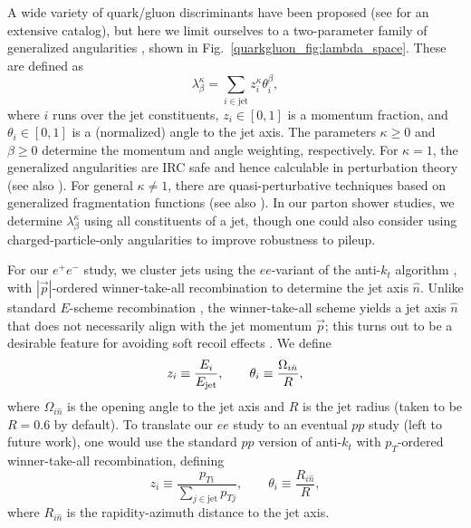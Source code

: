 \documentclass[11pt]{cernrep}
\begin{document}
A wide variety of quark/gluon discriminants have been proposed (see \cite{Gallicchio:2012ez} for an extensive catalog), but here we limit ourselves to a two-parameter family of generalized angularities \cite{Larkoski:2014pca}, shown in Fig.~\ref{quarkgluon_fig:lambda_space}.  These are defined as
\begin{equation}
\label{quarkgluon_eq:genang}
\lambda^{\kappa}_{\beta} = \sum_{i \in \text{jet}} z_i^\kappa \theta_i^\beta,
\end{equation}
where $i$ runs over the jet constituents, $z_i \in [0,1]$ is a momentum fraction, and $\theta_i \in [0,1]$ is a (normalized) angle to the jet axis.  The parameters $\kappa \ge 0$ and $\beta \ge 0$ determine the momentum and angle weighting, respectively.  For $\kappa = 1$, the generalized angularities are IRC safe and hence calculable in perturbation theory \cite{Larkoski:2014uqa} (see also \cite{Ellis:2010rwa,Larkoski:2013paa,Larkoski:2014tva,Procura:2014cba,Hornig:2016ahz}).  For general $\kappa \not= 1$, there are quasi-perturbative techniques based on generalized fragmentation functions \cite{Larkoski:2014pca} (see also \cite{Krohn:2012fg,Waalewijn:2012sv,Chang:2013rca,Chang:2013iba}).  In our parton shower studies, we determine $\lambda^{\kappa}_{\beta}$ using all constituents of a jet, though one could also consider using charged-particle-only angularities to improve robustness to pileup.

For our $e^+ e^-$ study, we cluster jets using the $ee$-variant of the anti-$k_t$ algorithm \cite{Cacciari:2008gp}, with $|\vec{p}|$-ordered winner-take-all recombination \cite{Larkoski:2014uqa,Bertolini:2013iqa,Salam:WTAUnpublished} to determine the jet axis $\hat{n}$.  Unlike standard $E$-scheme recombination \cite{Blazey:2000qt}, the winner-take-all scheme yields a jet axis $\hat{n}$ that does not necessarily align with the jet momentum $\vec{p}$; this turns out to be a desirable feature for avoiding soft recoil effects \cite{Larkoski:2013eya,Larkoski:2014uqa,Catani:1992jc,Dokshitzer:1998kz,Banfi:2004yd}.  We define
\begin{equation}
z_i \equiv \frac{E_i}{E_{\rm jet}}, \qquad \theta_i \equiv \frac{\Omega_{i \hat{n}}}{R},
\end{equation}
where $\Omega_{i \hat{n}}$ is the opening angle to the jet axis and $R$ is the jet radius (taken to be $R = 0.6$ by default).  To translate our $ee$ study to an eventual $pp$ study (left to future work), one would use the standard $pp$ version of anti-$k_t$ with $p_T$-ordered winner-take-all recombination, defining
\begin{equation}
z_i \equiv \frac{p_{Ti}}{\sum_{j \in \text{jet}} p_{Tj}}, \qquad \theta_i \equiv \frac{R_{i \hat{n}}}{R},
\end{equation}
where $R_{i \hat{n}}$ is the rapidity-azimuth distance to the jet axis.
\end{document}
